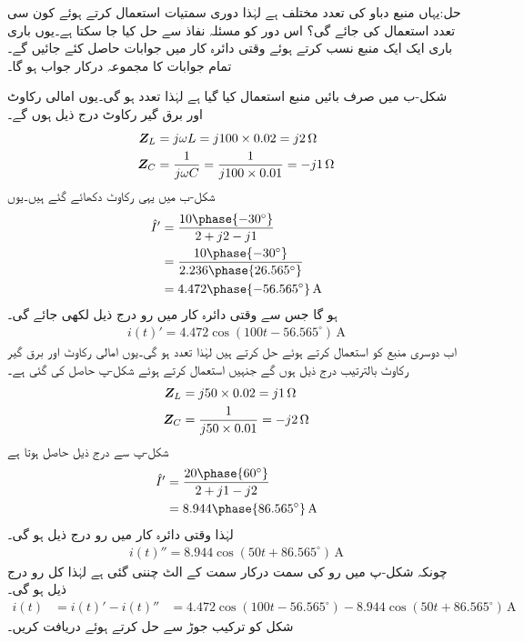 حل:یہاں منبع دباو کی تعدد مختلف ہے لہٰذا دوری سمتیات استعمال کرتے ہوئے کون سی تعدد استعمال کی جائے گی؟ اس دور کو مسئلہ نفاذ سے حل کیا جا سکتا ہے۔یوں باری باری ایک ایک منبع نسب کرتے ہوئے وقتی دائرہ کار میں جوابات حاصل کئے جائیں گے۔تمام جوابات کا مجموعہ درکار جواب ہو گا۔

شکل-ب میں صرف بائیں منبع استعمال کیا گیا ہے لہٰذا تعدد  ہو گی۔یوں امالی رکاوٹ اور برق گیر رکاوٹ درج ذیل ہوں گے۔
\begin{align*}
{\ensuremath{{\boldsymbol{Z}}}}_L&=j\omega L=j 100\times 0.02=j2 \,\si{\ohm}\\
{{\boldsymbol{Z}}}_C&=\frac{1}{j \omega C}=\frac{1}{j 100 \times 0.01}=-j1 \,\si{\ohm}
\end{align*}
شکل-ب میں یہی رکاوٹ دکھائے گئے ہیں۔یوں
\begin{align*}
\hat{I}'&=\frac{10\phase{-30^{\circ}}}{2+j2-j1}\\
&=\frac{10\phase{-30^{\circ}}}{2.236\phase{26.565^{\circ}}}\\
&=4.472\phase{-56.565^{\circ}}\,\si{\ampere}
\end{align*}
ہو گا جس سے وقتی دائرہ کار میں رو درج ذیل لکھی جائے گی۔
\begin{align*}
i(t)'=4.472\cos(100t-56.565^{\circ})\,\si{\ampere}
\end{align*}
اب دوسری منبع کو استعمال کرتے ہوئے حل کرتے ہیں لہٰذا تعدد  ہو گی۔یوں امالی رکاوٹ اور برق گیر رکاوٹ بالترتیب درج ذیل ہوں گے جنہیں استعمال کرتے ہوئے شکل-پ حاصل کی گئی ہے۔
\begin{align*}
{\ensuremath{{\boldsymbol{Z}}}}_L&=j50\times 0.02=j1 \,\si{\ohm}\\
{{\boldsymbol{Z}}}_C&=\frac{1}{j50\times 0.01}=-j2\,\si{\ohm}
\end{align*}
شکل-پ سے درج ذیل حاصل ہوتا ہے
\begin{align*}
\hat{I}'&=\frac{20\phase{60^{\circ}}}{2+j1-j2}\\
&=8.944\phase{86.565^{\circ}}\,\si{\ampere}
\end{align*}
لہٰذا وقتی دائرہ کار میں رو درج ذیل ہو گی۔
\begin{align*}
i(t)''=8.944\cos(50t+86.565^{\circ})\,\si{\ampere}
\end{align*}
چونکہ شکل-پ میں رو کی سمت درکار سمت کے الٹ چننی گئی ہے لہٰذا کل رو درج ذیل ہو گی۔
\begin{align*}
i(t)&=i(t)'-i(t)''
&=4.472\cos(100t-56.565^{\circ})-8.944\cos(50t+86.565^{\circ})\, \si{\ampere}
\end{align*}
شکل  کو ترکیب جوڑ سے حل کرتے ہوئے  دریافت کریں۔

